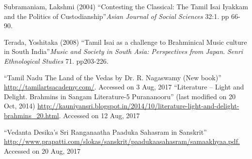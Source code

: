 \begin{thebibliography}{99}
  Subramaniam, Lakshmi (2004) “Contesting the Classical: The Tamil Isai Iyakkam and the Politics of Custodianship”\textit{Asian Journal of Social Sciences} 32:1. pp 66-90.

  Terada, Yoshitaka (2008) “Tamil Isai as a challenge to Brahminical Music culture in South India”\textit{Music and Society in South Asia: Perspectives from Japan}. \textit{Senri Ethnological Studies }71. pp203-226.

  “Tamil Nadu The Land of the Vedas by Dr. R. Nagaswamy (New book)” \url{http://tamilartsacademy.com/}. Accessed on 3 Aug, 2017 “Literature – Light and Delight. Brahmins in Sangam Literature-5 Purananooru” (last modified on 20 Oct, 2014) \url{http://kauniyansri.blogspot.in/2014/10/literature-light-and-delight-brahmins_20.html}. Accessed on 12 Aug, 2017

  “Vedanta Desika’s Sri Ranganaatha Paaduka Sahasram in Sanskrit” \url{http://www.prapatti.com/slokas/sanskrit/paadukaasahasram/samaakhyaa.pdf.} Accessed on 20 Aug, 2017

 \end{thebibliography}

\theendnotes

